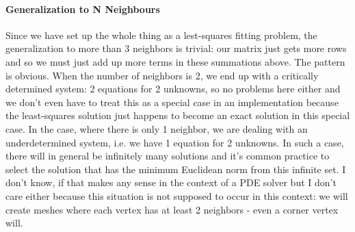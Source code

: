 \paragraph{Generalization to N Neighbours}
Since we have set up the whole thing as a lest-squares fitting problem, the generalization to more than 3 neighbors is trivial: our matrix just gets more rows and so we must just add up more terms in these summations above. The pattern is obvious. When the number of neighbors is 2, we end up with a critically determined system: 2 equations for 2 unknowns, so no problems here either and we don't even have to treat this as a special case in an implementation because the least-squares solution just happens to become an exact solution in this special case. In the case, where there is only 1 neighbor, we are dealing with an underdetermined system, i.e. we have 1 equation for 2 unknowns. In such a case, there will in general be infinitely many solutions and it's common practice to select the solution that has the minimum Euclidean norm from this infinite set. I don't know, if that makes any sense in the context of a PDE solver but I don't care either because this situation is not supposed to occur in this context: we will create meshes where each vertex has at least 2 neighbors - even a corner vertex will.


